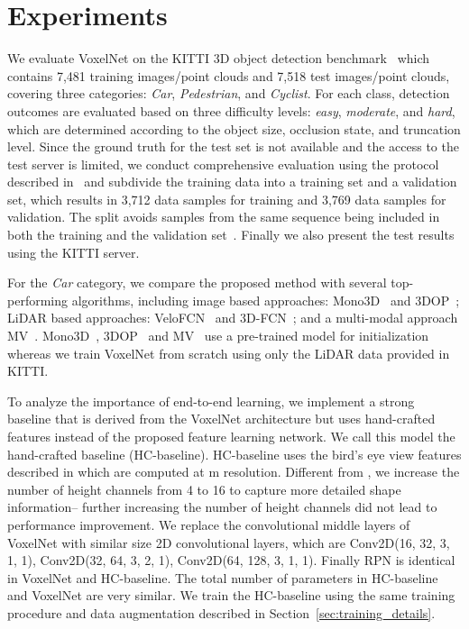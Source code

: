 \documentclass[10pt,twocolumn,letterpaper]{article}
\begin{document}
\section{Experiments}
\label{sec:Experiment}
We evaluate VoxelNet on the KITTI 3D object detection benchmark~\cite{REF:Geiger2012CVPR} which contains 7,481 training images/point clouds and 7,518 test images/point clouds, covering three categories: \textit{Car}, \textit{Pedestrian}, and \textit{Cyclist}. For each class, detection outcomes are evaluated based on three difficulty levels: \textit{easy}, \textit{moderate}, and \textit{hard}, which are determined according to the object size, occlusion state, and truncation level. Since the ground truth for the test set is not available and the access to the test server is limited, we conduct comprehensive evaluation using the protocol described in~\cite{REF:nips15chen,REF:cvpr16chen,REF:cvpr17chen} and subdivide the training data into a training set and a validation set, which results in 3,712 data samples for training and 3,769 data samples for validation. The split avoids samples from the same sequence being included in both the training and the validation set~\cite{REF:cvpr16chen}. Finally we also present the test results using the KITTI server.

For the \textit{Car} category, we compare the proposed method with several top-performing algorithms, including image based approaches: Mono3D~\cite{REF:cvpr16chen} and 3DOP~\cite{REF:nips15chen}; LiDAR based approaches: VeloFCN~\cite{REF:VeloFCN} and 3D-FCN~\cite{REF:3DFCN}; and a multi-modal approach MV~\cite{REF:cvpr17chen}. Mono3D~\cite{REF:cvpr16chen}, 3DOP~\cite{REF:nips15chen} and MV~\cite{REF:cvpr17chen}  use a pre-trained model for initialization whereas we train VoxelNet from scratch using only the LiDAR data provided in KITTI.

To analyze the importance of end-to-end learning, we implement a strong baseline that is derived from the VoxelNet architecture but uses hand-crafted features instead of the proposed feature learning network. We call this model the hand-crafted baseline (HC-baseline). HC-baseline uses the bird's eye view features described in 
\cite{REF:cvpr17chen} which are computed at m resolution. Different from \cite{REF:cvpr17chen}, we increase the number of height channels from 4 to 16 to capture more detailed shape information-- further increasing the number of height channels did not lead to performance improvement. We replace the convolutional middle layers of VoxelNet with similar size 2D convolutional layers, which are Conv2D(16, 32, 3, 1, 1), Conv2D(32, 64, 3, 2, 1), Conv2D(64, 128, 3, 1, 1). Finally RPN is identical in VoxelNet and HC-baseline. The total number of parameters in HC-baseline and VoxelNet are very similar. We train the HC-baseline using the same training procedure and data augmentation described in Section~\ref{sec:training_details}. 
\end{document}
